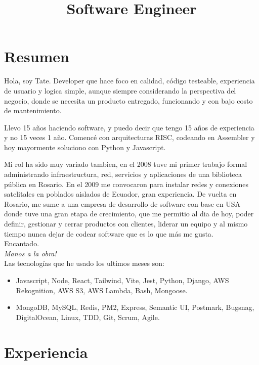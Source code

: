 \documentclass[11pt,a4paper,sans]{moderncv}        %
\title{Software Engineer}                               %
\begin{document}
\makecvtitle

\section{Resumen}

Hola, soy Tate. Developer que hace foco en calidad, código testeable, experiencia de usuario y logica simple, aunque siempre
considerando la perspectiva del negocio, donde se necesita un producto entregado, funcionando y con bajo costo de mantenimiento.

Llevo 15 años haciendo software, y puedo decir que tengo 15 años de experiencia y no 15 veces 1 año. Comencé con arquitecturas RISC,
codeando en Assembler y hoy mayormente soluciono con Python y Javascript.

Mi rol ha sido muy variado tambien, en el 2008 tuve mi primer trabajo formal administrando infraestructura, red, servicios y aplicaciones de una
biblioteca pública en Rosario. En el 2009 me convocaron para instalar redes y conexiones satelitales en poblados aislados de Ecuador, gran experiencia. De vuelta en Rosario,
me sume a una empresa de desarrollo de software con base en USA donde tuve una gran etapa de crecimiento, que me permitio al dia de hoy,
poder definir, gestionar y cerrar productos con clientes, liderar un equipo y al mismo tiempo nunca dejar de codear software que es lo que más me gusta.
\\

Encantado.\\
\textit{Manos a la obra!}\\

\medskip Las tecnologías que he usado los ultimos meses son:
\begin{itemize}
  \item Javascript, Node, React, Tailwind, Vite, Jest, Python, Django, AWS Rekognition, AWS S3, AWS Lambda, Bash, Mongoose.
  \item MongoDB, MySQL, Redis, PM2, Express, Semantic UI, Postmark, Bugsnag, DigitalOcean, Linux, TDD, Git, Scrum, Agile.
\end{itemize}

\clearpage

\section{Experiencia}
\end{document}
